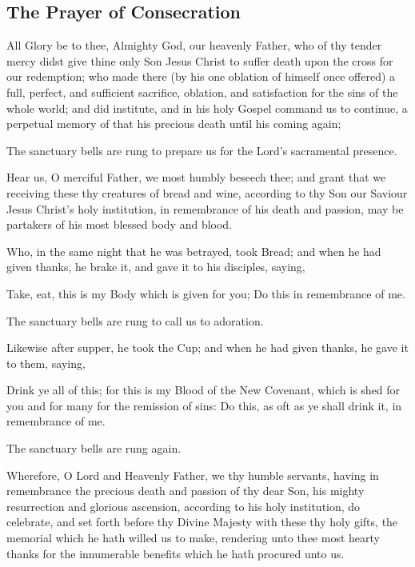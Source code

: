 \subsection{The Prayer of Consecration}

All Glory be to thee, Almighty God, our heavenly Father, who of thy
tender mercy didst give thine only Son Jesus Christ to suffer death upon the
cross for our redemption; who made there (by his one oblation of himself
once offered) a full, perfect, and sufficient sacrifice, oblation, and satisfaction
for the sins of the whole world; and did institute, and in his holy Gospel
command us to continue, a perpetual memory of that his precious death until his coming again;

\begin{rubric}
The sanctuary bells are rung to prepare us for the Lord's sacramental presence.
\end{rubric}

Hear us, O merciful Father, we most humbly beseech thee; and grant that we
receiving these thy creatures of bread and wine, according to thy Son our
Saviour Jesus Christ's holy institution, in remembrance of his death and
passion, may be partakers of his most blessed body and blood.

Who, in the same night that he was betrayed, took Bread; and when he had
given thanks, he brake it, and gave it to his disciples, saying,

Take, eat, this is my Body which is given for you; Do this in remembrance of me. \cross

\begin{rubric}
The sanctuary bells are rung to call us to adoration.
\end{rubric}

Likewise after supper, he took the Cup; and when he had given thanks, he gave it to them, saying,

Drink ye all of this; for this is my Blood of the New Covenant,
which is shed for you and for many for the remission of sins:
Do this, as oft as ye shall drink it, in remembrance of me. \cross

\begin{rubric}
The sanctuary bells are rung again.
\end{rubric}

Wherefore, O Lord and Heavenly Father, we thy humble
servants, having in remembrance the precious death and passion of thy dear
Son, his mighty resurrection and glorious ascension, according to his holy
institution, do celebrate, and set forth before thy Divine Majesty with these thy
holy gifts, the memorial which he hath willed us to make, rendering unto thee
most hearty thanks for the innumerable benefits which he hath procured unto us.

